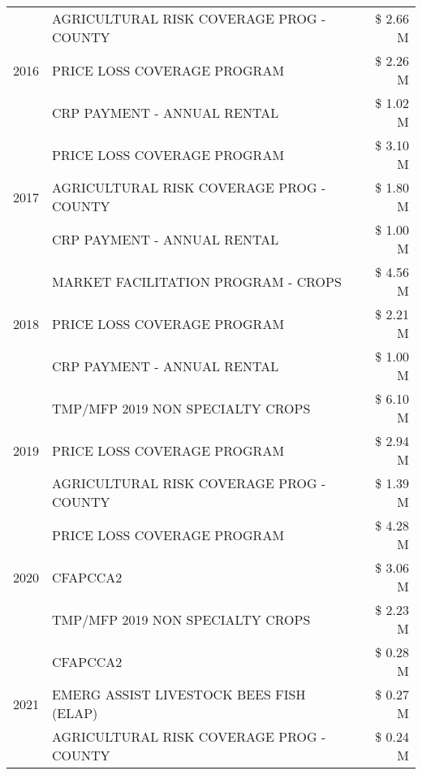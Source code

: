 \begin{tabular}{llr}
\cline{1-3}
\multirow[t]{3}{*}{2016} & AGRICULTURAL RISK COVERAGE PROG - COUNTY & \$ 2.66 M \\
 & PRICE LOSS COVERAGE PROGRAM & \$ 2.26 M \\
 & CRP PAYMENT - ANNUAL RENTAL & \$ 1.02 M \\
\cline{1-3}
\multirow[t]{3}{*}{2017} & PRICE LOSS COVERAGE PROGRAM & \$ 3.10 M \\
 & AGRICULTURAL RISK COVERAGE PROG - COUNTY & \$ 1.80 M \\
 & CRP PAYMENT - ANNUAL RENTAL & \$ 1.00 M \\
\cline{1-3}
\multirow[t]{3}{*}{2018} & MARKET FACILITATION PROGRAM - CROPS & \$ 4.56 M \\
 & PRICE LOSS COVERAGE PROGRAM & \$ 2.21 M \\
 & CRP PAYMENT - ANNUAL RENTAL & \$ 1.00 M \\
\cline{1-3}
\multirow[t]{3}{*}{2019} & TMP/MFP 2019 NON SPECIALTY CROPS & \$ 6.10 M \\
 & PRICE LOSS COVERAGE PROGRAM & \$ 2.94 M \\
 & AGRICULTURAL RISK COVERAGE PROG - COUNTY & \$ 1.39 M \\
\cline{1-3}
\multirow[t]{3}{*}{2020} & PRICE LOSS COVERAGE PROGRAM & \$ 4.28 M \\
 & CFAPCCA2 & \$ 3.06 M \\
 & TMP/MFP 2019 NON SPECIALTY CROPS & \$ 2.23 M \\
\cline{1-3}
\multirow[t]{3}{*}{2021} & CFAPCCA2 & \$ 0.28 M \\
 & EMERG ASSIST LIVESTOCK BEES FISH (ELAP) & \$ 0.27 M \\
 & AGRICULTURAL RISK COVERAGE PROG - COUNTY & \$ 0.24 M \\
\cline{1-3}
\bottomrule
\end{tabular}
